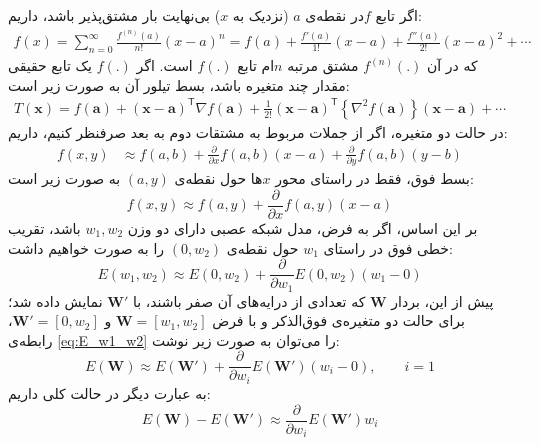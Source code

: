 \documentclass[11pt, twoside]{imsproc}
\begin{document}
اگر تابع $f$‌در نقطه‌ی $a$ (نزدیک به $x$) بی‌نهایت بار مشتق‌پذیر باشد،‌ داریم:
\begin{align}
f(x) = \sum_{n=0} ^ {\infty} \frac {f^{(n)}(a)}{n!} (x-a)^{n}
= f(a)+\frac {f'(a)}{1!} (x-a)+ \frac{f''(a)}{2!} (x-a)^2+ \cdots %
\end{align}
که در آن
$f^{(n)}(.)$
مشتق مرتبه $n$ام تابع $f(.)$ است.
اگر $f(.)$ یک تابع حقیقی مقدار چند متغیره باشد،‌ بسط تیلور آن به صورت زیر است:
\begin{align}
T(\mathbf{x}) = f(\mathbf{a}) + (\mathbf{x} - \mathbf{a})^\mathsf{T} \nabla f(\mathbf{a})%
+ \frac{1}{2!} (\mathbf{x} - \mathbf{a})^\mathsf{T} \left \{\nabla^2 f(\mathbf{a}) \right \} (\mathbf{x} - \mathbf{a}) + \cdots
\end{align}
در حالت دو متغیره،‌ اگر از جملات مربوط به مشتقات دوم به بعد صرفنظر کنیم، داریم:
\begin{align}
f(x,y) &\approx f(a,b) +\frac{\partial }{\partial x}f(a,b)(x-a)  + \frac{\partial }{\partial y}f(a,b) (y-b)
\end{align}
بسط فوق، فقط در راستای محور $x$ها حول نقطه‌ی
$(a,y)$
به صورت زیر است:
$$f(x,y) \approx f(a,y) + \frac{\partial }{\partial x}f(a,y)(x-a) $$
بر این اساس،‌ اگر به فرض، مدل شبکه عصبی دارای دو وزن
$w_1,w_2$
باشد،‌ تقریب خطی فوق  در راستای
$w_1$
حول نقطه‌ی
$(0,w_2)$
را به صورت خواهیم داشت:
\begin{equation}
\label{eq:E_w1_w2}
E(w_1,w_2) \approx E(0,w_2) + \frac{\partial}{\partial w_1}E(0,w_2)(w_1-0)
\end{equation}
پیش از این، بردار
$\mathbf{W}$
که تعدادی از درایه‌های آن صفر باشند، با
$\mathbf{W'}$
نمایش داده شد؛  برای حالت دو متغیره‌ی فوق‌الذکر و با فرض
$\mathbf{W}=[w_1,w_2]$
و
$\mathbf{W'}=[0,w_2]$،
رابطه‌ی
  \eqref{eq:E_w1_w2}
را می‌توان به صورت زیر نوشت:
\begin{equation}
E(\mathbf{W}) \approx E(\mathbf{W'}) + \frac{\partial}{\partial w_i}E(\mathbf{W'})(w_i-0),  \qquad i=1
\end{equation}
به عبارت دیگر در حالت کلی داریم:
\begin{equation}
E(\mathbf{W})-E(\mathbf{W'}) \approx  \frac{\partial}{\partial w_i}E(\mathbf{W'})w_i
\end{equation}
\end{document}
